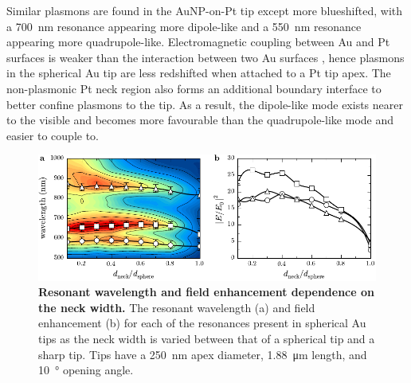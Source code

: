 \documentclass{article}
\begin{document}
Similar plasmons are found in the AuNP-on-Pt tip except more blueshifted, with a \SI{700}{nm} resonance appearing more dipole-like and a \SI{550}{nm} resonance appearing more quadrupole-like.
Electromagnetic coupling between Au and Pt surfaces is weaker than the interaction between two Au surfaces \cite{ren2004}, hence plasmons in the spherical Au tip are less redshifted when attached to a Pt tip apex. The non-plasmonic Pt neck region also forms an additional boundary interface to better confine plasmons to the tip. As a result, the dipole-like mode exists nearer to the visible and becomes more favourable than the quadrupole-like mode and easier to couple to. %

\begin{figure}[b]
\centering
\includegraphics{figures/neck_size_dependence_contour}
\caption[Resonant wavelength and field enhancement dependence on the neck width]{\textbf{Resonant wavelength and field enhancement dependence on the neck width.} The resonant wavelength (a) and field enhancement (b) for each of the resonances present in spherical Au tips as the neck width is varied between that of a spherical tip and a sharp tip. Tips have a \SI{250}{nm} apex diameter, \SI{1.88}{\micro\metre} length, and \SI{10}{\degree} opening angle.}
\label{fig:neck_size_dependence}
\end{figure}
\end{document}
